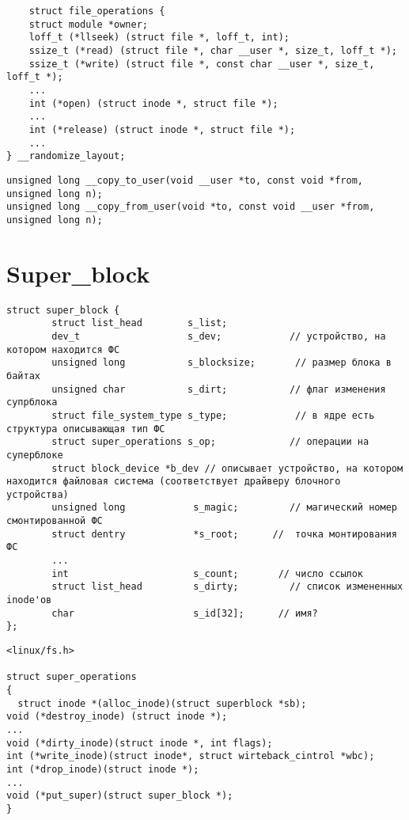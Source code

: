 \begin{lstlisting}
	struct file_operations {
	struct module *owner;
	loff_t (*llseek) (struct file *, loff_t, int);
	ssize_t (*read) (struct file *, char __user *, size_t, loff_t *);
	ssize_t (*write) (struct file *, const char __user *, size_t, loff_t *);
	...
	int (*open) (struct inode *, struct file *);
	...
	int (*release) (struct inode *, struct file *);
	...
} __randomize_layout;
\end{lstlisting}

\begin{lstlisting}
unsigned long __copy_to_user(void __user *to, const void *from, unsigned long n);
unsigned long __copy_from_user(void *to, const void __user *from, unsigned long n);
\end{lstlisting}

\section*{Super\_block}

\begin{lstlisting}
struct super_block {
        struct list_head        s_list;            
        dev_t                   s_dev;            // устройство, на котором находится ФС
        unsigned long           s_blocksize;       // размер блока в байтах
        unsigned char           s_dirt;           // флаг изменения супрблока
        struct file_system_type s_type;            // в ядре есть структура описывающая тип ФС
        struct super_operations s_op;             // операции на суперблоке
        struct block_device *b_dev // описывает устройство, на котором находится файловая система (соответствует драйверу блочного устройства)
        unsigned long            s_magic;         // магический номер смонтированной ФС
        struct dentry            *s_root;      //  точка монтирования ФС
        ...
        int                      s_count;       // число ссылок
        struct list_head         s_dirty;         // список измененных inode'ов
        char                     s_id[32];      // имя?
};
\end{lstlisting}

\begin{lstlisting}
<linux/fs.h>

struct super_operations
{
  struct inode *(alloc_inode)(struct superblock *sb);
void (*destroy_inode) (struct inode *);
...
void (*dirty_inode)(struct inode *, int flags);
int (*write_inode)(struct inode*, struct wirteback_cintrol *wbc);
int (*drop_inode)(struct inode *);
...
void (*put_super)(struct super_block *);
}
\end{lstlisting}

